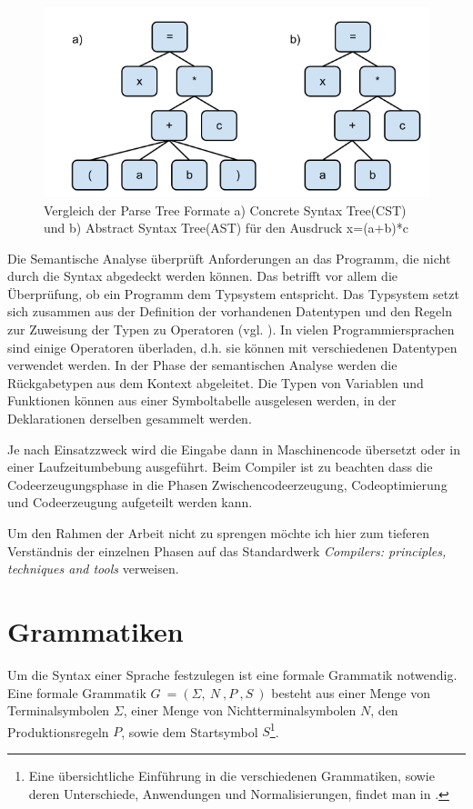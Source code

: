 \begin{figure}[h]
\includegraphics[width=\textwidth,scale=0.5]{figures/ast_vs_cst.png}
\caption{Vergleich der Parse Tree Formate a) Concrete Syntax Tree(CST) und b) Abstract Syntax Tree(AST) für den Ausdruck x=(a+b)*c}
\label{abb_ast_vs_cst}
\end{figure}

Die Semantische Analyse überprüft Anforderungen an das Programm, die nicht durch die Syntax abgedeckt werden können. Das betrifft vor allem die Überprüfung, ob ein Programm dem Typsystem entspricht. Das Typsystem setzt sich zusammen aus der Definition der vorhandenen Datentypen und den Regeln zur Zuweisung der Typen zu Operatoren (vgl. \cite[S. 426]{AhSe86}). In vielen Programmiersprachen sind einige Operatoren überladen, d.h. sie können mit verschiedenen Datentypen verwendet werden. In der Phase der semantischen Analyse werden die Rückgabetypen aus dem Kontext abgeleitet. Die Typen von Variablen und Funktionen können aus einer Symboltabelle ausgelesen werden, in der Deklarationen derselben gesammelt werden.

Je nach Einsatzzweck wird die Eingabe dann in Maschinencode übersetzt oder in einer Laufzeitumbebung ausgeführt. Beim Compiler ist zu beachten dass die Codeerzeugungsphase in die Phasen Zwischencodeerzeugung, Codeoptimierung und Codeerzeugung aufgeteilt werden kann. 

Um den Rahmen der Arbeit nicht zu sprengen möchte ich hier zum tieferen Verständnis der einzelnen Phasen auf das Standardwerk \emph{Compilers: principles, techniques and tools} \cite{AhSe86} verweisen.


\section{Grammatiken}

Um die Syntax einer Sprache festzulegen ist eine formale Grammatik notwendig. Eine formale Grammatik $G \ = (\Sigma,\ N\ ,P\ ,S\ )$ besteht aus einer Menge von Terminalsymbolen $\Sigma$, einer Menge von Nichtterminalsymbolen $N$, den Produktionsregeln $P$, sowie dem Startsymbol $S$\footnote{Eine übersichtliche Einführung in die verschiedenen Grammatiken, sowie deren Unterschiede, Anwendungen und Normalisierungen, findet man in \cite{VoWi02}.}.

